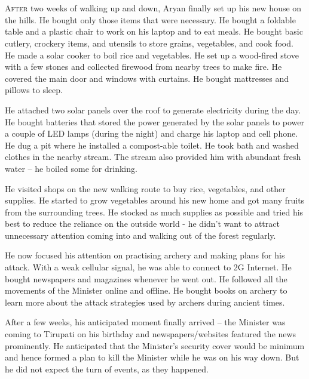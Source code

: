 \chapter{}

\lettrine{A}{fter} two weeks of walking up and down, Aryan finally set up his new house on
the hills. He bought only those items that were necessary. He bought a foldable
table and a plastic chair to work on his laptop and to eat meals. He bought
basic cutlery, crockery items, and utensils to store grains, vegetables, and
cook food. He made a solar cooker to boil rice and vegetables. He set up a
wood-fired stove with a few stones and collected firewood from nearby trees to
make fire. He covered the main door and windows with curtains. He bought
mattresses and pillows to sleep.

He attached two solar panels over the roof to generate electricity during the
day. He bought batteries that stored the power generated by the solar panels to
power a couple of LED lamps (during the night) and charge his laptop and cell
phone. He dug a pit where he installed a compost-able toilet. He took bath and
washed clothes in the nearby stream. The stream also provided him with abundant
fresh water – he boiled some for drinking.

He visited shops on the new walking route to buy rice, vegetables, and other
supplies. He started to grow vegetables around his new home and got many fruits
from the surrounding trees. He stocked as much supplies as possible and tried his
best to reduce the reliance on the outside world - he didn't want to attract
unnecessary attention coming into and walking out of the forest regularly.

He now focused his attention on practising archery and making plans for his
attack. With a weak cellular signal, he was able to connect to 2G Internet. He
bought newspapers and magazines whenever he went out. He followed all the
movements of the Minister online and offline. He bought books on archery to
learn more about the attack strategies used by archers during ancient times.

After a few weeks, his anticipated moment finally arrived – the Minister was
coming to Tirupati on his birthday and newspapers/websites featured the news
prominently. He anticipated that the Minister's security cover would be minimum
and hence formed a plan to kill the Minister while he was on his way down. But
he did not expect the turn of events, as they happened.